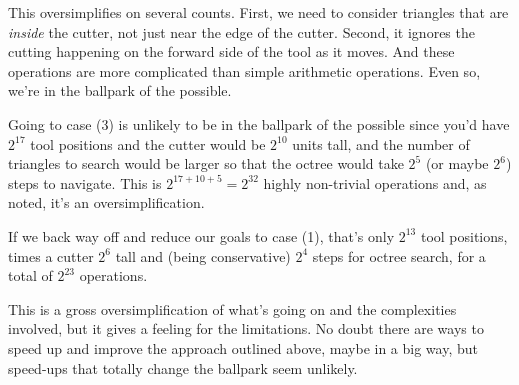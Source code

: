\documentclass[titlepage,oneside,10pt]{article}
\begin{document}
This oversimplifies on several counts. First, we need to consider
triangles that are \emph{inside} the cutter, not just near the edge of
the cutter. Second, it ignores the cutting happening on the forward
side of the tool as it moves. And these operations are more
complicated than simple arithmetic operations. Even so, we're in the
ballpark of the possible.

Going to case (3) is unlikely to be in the ballpark of the possible since
you'd have $2^{17}$ tool positions and the cutter would be $2^{10}$
units tall, and the number of triangles to search would be larger so
that the octree would take $2^5$ (or maybe $2^6$) steps to
navigate. This is $2^{17+10+5} = 2^{32}$ highly non-trivial
operations and, as noted, it's an oversimplification.

If we back way off and reduce our goals to case (1), that's only
$2^{13}$ tool positions, times a cutter $2^6$ tall and (being
conservative) $2^4$ steps for octree search, for a total of $2^{23}$
operations.

This is a gross oversimplification of what's going on and the
complexities involved, but it gives a feeling for the
limitations. No doubt there are ways to speed up and improve the
approach outlined above, maybe in a big way, but speed-ups that
totally change the ballpark seem unlikely. 
\end{document}
